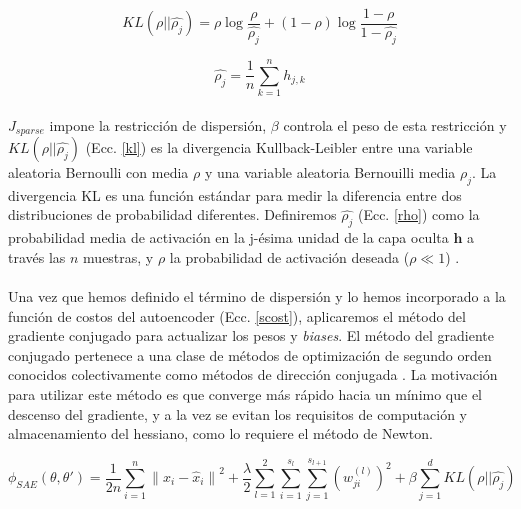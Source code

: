 \documentclass[12pt]{article}%
\begin{document}
\begin{equation}
\label{kl}
KL(\rho||\hat{\rho_{j}})={\rho} \log\frac{\rho}{\hat{\rho_{j}}}+(1-\rho)\log\frac{1-\rho}{1-\hat{\rho_{j}}}
\end{equation} 

\begin{equation}
\label{rho}
\hat{\rho_{j}}=\frac{1}{n}\sum_{k=1}^{n}h_{j,k}
\end{equation} 

\paragraph{}
$J_{sparse}$ impone la restricción de dispersión, $\beta$ controla el peso de esta restricción y $KL(\rho||\hat{\rho_{j}})$ (Ecc. \ref{kl}) es la divergencia Kullback-Leibler entre una variable aleatoria Bernoulli con media $\rho$ y una variable aleatoria Bernouilli media $\hat{\rho_{j}}$. La divergencia KL es una función estándar para medir la diferencia entre dos distribuciones de probabilidad diferentes. Definiremos $\hat{\rho_{j}}$ (Ecc. \ref{rho}) como la probabilidad media de activación en la j-ésima unidad de la capa oculta $\textbf{h}$ a través las $n$ muestras, y $\rho$ la probabilidad de activación deseada ($\rho\ll1$) \cite{song}. 

\paragraph{}
Una vez que hemos definido el término de dispersión y lo hemos incorporado a la función de costos del autoencoder (Ecc. \ref{scost}), aplicaremos el método del gradiente conjugado para actualizar los pesos y \textit{biases}. El método del gradiente conjugado pertenece a una clase de métodos de optimización de segundo orden conocidos colectivamente como métodos de dirección conjugada \cite{haykin}. La motivación para utilizar este método es que converge más rápido hacia un mínimo que el descenso del gradiente, y a la vez se evitan los requisitos de computación y almacenamiento del hessiano, como lo requiere el método de Newton.

\begin{equation}
\label{scost}
\phi_{SAE}(\theta,\theta')=\frac{1}{2n}\sum_{i=1}^{n}{\|x_{i}-\hat{x}_{i}\|}^2 + \frac{\lambda}{2}\sum_{l=1}^{2}\sum_{i=1}^{s_l}\sum_{j=1}^{s_{l+1}}({w^{(l)}_{ji}})^2 + \beta\sum_{j=1}^{d}KL(\rho||\hat{\rho_{j}})
\end{equation} 
\end{document}
